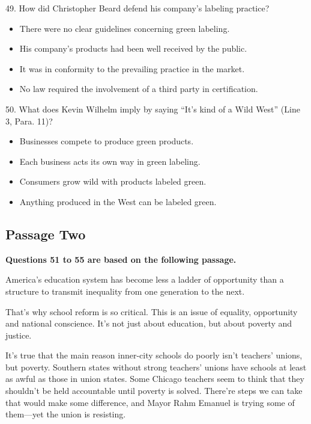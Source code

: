 \documentclass[UTF8,11pt]{ctexart}
\begin{document}
49. How did Christopher Beard defend his company’s labeling practice?


\begin{itemize}[leftmargin=2em,itemsep=.2em,topsep=.4em]\item[A.] There were no clear guidelines concerning green labeling.
\item[B.] His company’s products had been well received by the public.
\item[C.] It was in conformity to the prevailing practice in the market.
\item[D.] No law required the involvement of a third party in certification.
\end{itemize}

50. What does Kevin Wilhelm imply by saying “It’s kind of a Wild West” (Line 3, Para. 11)?


\begin{itemize}[leftmargin=2em,itemsep=.2em,topsep=.4em]\item[A.] Businesses compete to produce green products.
\item[B.] Each business acts its own way in green labeling.
\item[C.] Consumers grow wild with products labeled green.
\item[D.] Anything produced in the West can be labeled green.
\end{itemize}

\subsection*{\textbf{Passage Two}}


\textbf{Questions 51 to 55 are based on the following passage.}


America’s education system has become less a ladder of opportunity than a structure to transmit inequality from one generation to the next.


That’s why school reform is so critical. This is an issue of equality, opportunity and national conscience. It’s not just about education, but about poverty and justice.


It’s true that the main reason inner-city schools do poorly isn’t teachers’ unions, but poverty. Southern states without strong teachers’ unions have schools at least as awful as those in union states. Some Chicago teachers seem to think that they shouldn’t be held accountable until poverty is solved. There’re steps we can take that would make some difference, and Mayor Rahm Emanuel is trying some of them—yet the union is resisting.
\end{document}
